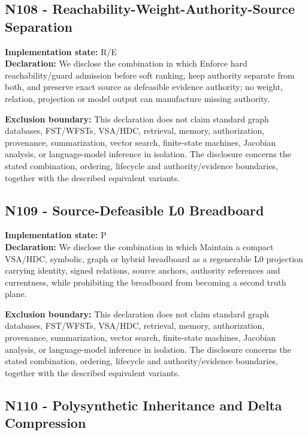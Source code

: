 \documentclass[
  10pt,
  letterpaper,
]{article}
\begin{document}
\subsection{N108 - Reachability-Weight-Authority-Source
Separation}\label{n108---reachability-weight-authority-source-separation}

\textbf{Implementation state:} R/E\\
\textbf{Declaration:} We disclose the combination in which Enforce hard
reachability/guard admission before soft ranking, keep authority
separate from both, and preserve exact source as defeasible evidence
authority; no weight, relation, projection or model output can
manufacture missing authority.

\textbf{Exclusion boundary:} This declaration does not claim standard
graph databases, FST/WFSTs, VSA/HDC, retrieval, memory, authorization,
provenance, summarization, vector search, finite-state machines,
Jacobian analysis, or language-model inference in isolation. The
disclosure concerns the stated combination, ordering, lifecycle and
authority/evidence boundaries, together with the described equivalent
variants.

\subsection{N109 - Source-Defeasible L0
Breadboard}\label{n109---source-defeasible-l0-breadboard}

\textbf{Implementation state:} P\\
\textbf{Declaration:} We disclose the combination in which Maintain a
compact VSA/HDC, symbolic, graph or hybrid breadboard as a regenerable
L0 projection carrying identity, signed relations, source anchors,
authority references and currentness, while prohibiting the breadboard
from becoming a second truth plane.

\textbf{Exclusion boundary:} This declaration does not claim standard
graph databases, FST/WFSTs, VSA/HDC, retrieval, memory, authorization,
provenance, summarization, vector search, finite-state machines,
Jacobian analysis, or language-model inference in isolation. The
disclosure concerns the stated combination, ordering, lifecycle and
authority/evidence boundaries, together with the described equivalent
variants.

\subsection{N110 - Polysynthetic Inheritance and Delta
Compression}\label{n110---polysynthetic-inheritance-and-delta-compression}
\end{document}
